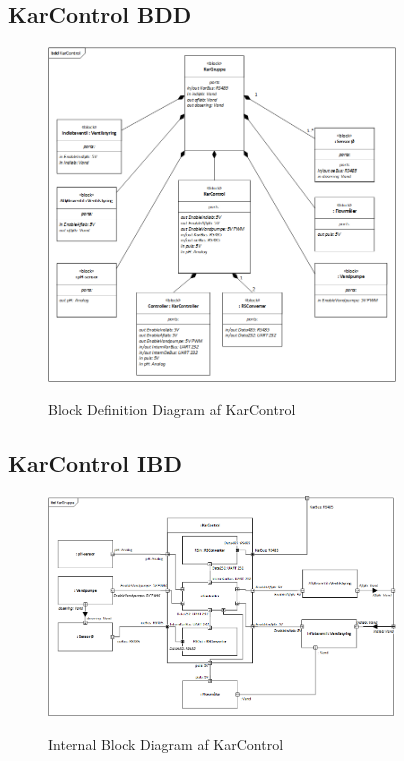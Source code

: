 
\subsection{KarControl BDD}

\begin{figure}[H]
	\centering
	\includegraphics[width=0.82\textwidth]{Systemarkitektur/KarControl/KarControl_BDD.png}
	\label{fig:KarControl BDD}
	\caption{Block Definition Diagram af KarControl}
\end{figure}



\subsection{KarControl IBD}

\begin{figure}[H]
	\centering
	\includegraphics[width=0.82\textwidth]{Systemarkitektur/KarControl/KarControl_IBD.png}
	\label{fig:KarControl IBD}
	\caption{Internal Block Diagram af KarControl}
\end{figure}

